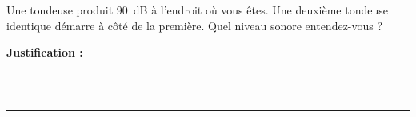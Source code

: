Une tondeuse produit \qty{90}{dB} à l'endroit où vous êtes. Une deuxième tondeuse identique démarre à côté de la première. Quel niveau sonore entendez-vous ?

\choices

\noindent\textbf{Justification :} \hrulefill \\[2.5ex]
\rule{\linewidth}{0.4pt} \\[2.5ex]
\rule{\linewidth}{0.4pt}
\vfill
